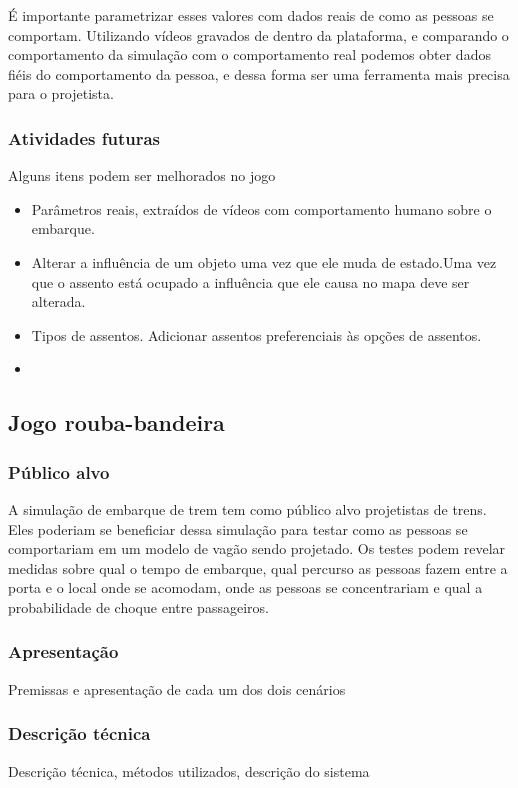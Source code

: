 \documentclass[a4paper]{article}
\begin{document}
É importante parametrizar esses valores com dados reais de como as pessoas se comportam. Utilizando vídeos gravados de dentro da plataforma, e comparando o comportamento da simulação com o comportamento real podemos obter dados fiéis do comportamento da pessoa, e dessa forma ser uma ferramenta mais precisa para o projetista.

\subsubsection{Atividades futuras}

Alguns itens podem ser melhorados no jogo

\begin{itemize}
\item Parâmetros reais, extraídos de vídeos com comportamento humano sobre o embarque.
\item Alterar a influência de um objeto uma vez que ele muda de estado.Uma vez que o assento está ocupado a influência que ele causa no mapa deve ser alterada.
\item Tipos de assentos. Adicionar assentos preferenciais às opções de assentos.
\item 
\end{itemize}

\subsection{Jogo rouba-bandeira}

\subsubsection{Público alvo}

A simulação de embarque de trem tem como público alvo projetistas de trens. Eles poderiam se beneficiar dessa simulação para testar como as pessoas se comportariam em um modelo de vagão sendo projetado. Os testes podem revelar medidas sobre qual o tempo de embarque, qual percurso as pessoas fazem entre a porta e o local onde se acomodam, onde as pessoas se concentrariam e qual a probabilidade de choque entre passageiros.

\subsubsection{Apresentação}
Premissas e apresentação de cada um dos dois cenários

\subsubsection{Descrição técnica}
Descrição técnica, métodos utilizados, descrição do sistema
\end{document}
